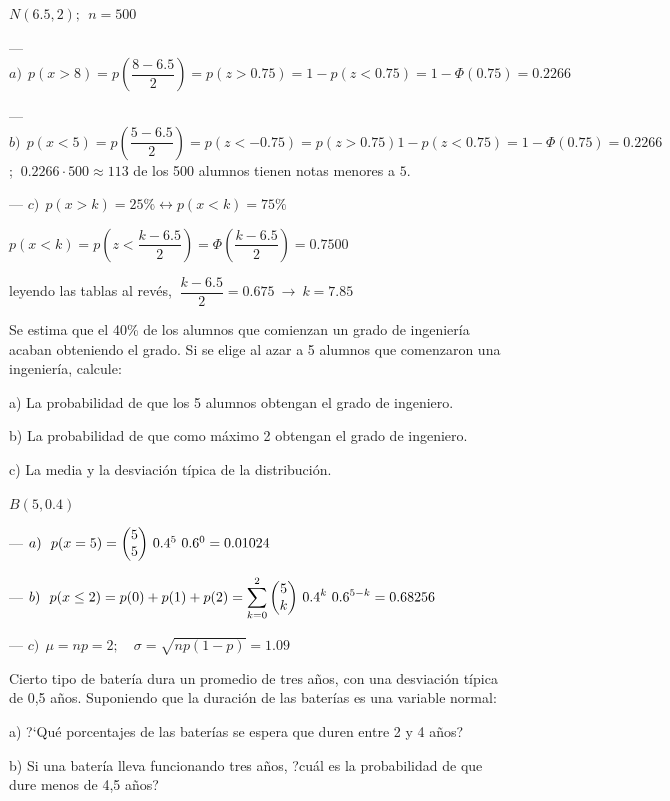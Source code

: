 $N(6.5,2);\ \ n=500$

--- $a)\ \ p(x>8)=p\left( \dfrac{8-6.5}{2} \right) = p(z>0.75)=1-p(z<0.75)=1-\Phi(0.75)=0.2266$

--- $b)\ \ p(x<5)=p\left( \dfrac{5-6.5}{2} \right) =p(z<-0.75)=p(z>0.75)1-p(z<0.75)=1-\Phi(0.75)=0.2266$
; $\ 0.2266 \cdot 500 \approx 113$ de los 500 alumnos tienen notas menores a $5$.

--- $c)\ \ p(x>k)=25\% \leftrightarrow p(x<k)=75\%$

$p(x<k)=p\left(z< \dfrac{k-6.5}{2} \right) =\Phi \left(\dfrac{k-6.5}{2} \right)=0.7500$

leyendo las tablas al revés, $\ \dfrac{k-6.5}{2}=0.675 \ \to \ k=7.85$



\vspace{4mm}
\begin{ejemplo}
\begin{ejer}
	 Se estima que el 40\% de los alumnos que comienzan un grado de ingeniería acaban obteniendo el grado. Si se elige al azar a 5 alumnos que comenzaron una ingeniería, calcule:
	 
a) La probabilidad de que los 5 alumnos obtengan el grado de ingeniero.

b) La probabilidad de que como máximo 2 obtengan el grado de ingeniero. 

c) La media y la desviación típica de la distribución.

\end{ejer}
\end{ejemplo}

$B(5,0.4)$

--- $a)\ \ p(x=5)=\mqty(5\\5)\ 0.4^5\ 0.6^0=0.01024$

--- $b)\ \ p(x\le 2)=p(0)+p(1)+p(2)=\displaystyle \sum_{k=0}^2 \mqty(5\\k) \ 0.4^k\ 0.6^{5-k}=0.68256$

--- $c)\ \ \mu=np=2;\quad \sigma=\sqrt{np(1-p)}=1.09$


\vspace{4mm}
\begin{ejemplo}
\begin{ejer}
Cierto tipo de batería dura un promedio de tres años, con una desviación típica de 0,5 años. Suponiendo que la duración de las baterías es una variable normal:

a) ?`Qué porcentajes de las baterías se espera que duren entre 2 y 4 años?

b) Si una batería lleva funcionando tres años, ?cuál es la probabilidad de que dure menos de 4,5 años?
\end{ejer}
\end{ejemplo}

